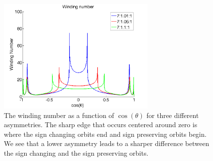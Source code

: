 \begin{figure}[H]
\begin{center}
\includegraphics[width=0.7\textwidth]{figures/theory/WindingTrend.png}
\end{center}
\caption{The winding number as a function of $\cos(\theta)$ for three different asymmetries. The sharp edge that occurs centered around zero is where the sign changing orbits end and sign preserving orbits begin. We see that a lower asymmetry leads to a sharper difference between the sign changing and the sign preserving orbits.}
\label{fig:windingdifferent}
\end{figure}
